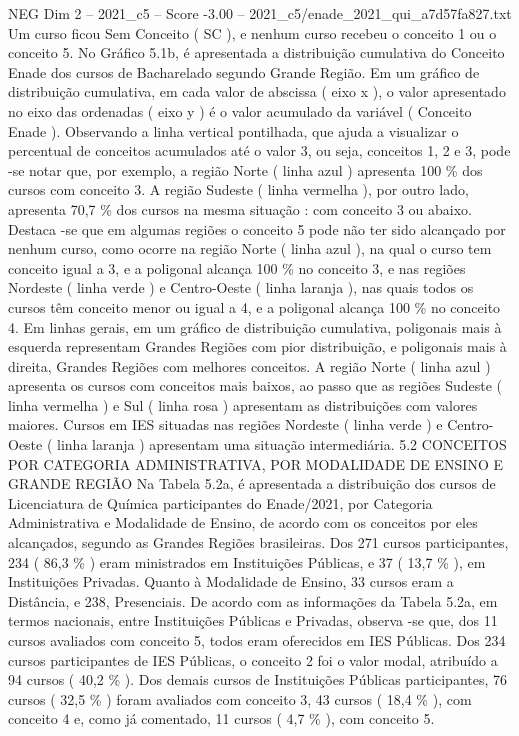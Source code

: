 \begin{textsample}{NEG Dim 2 – 2021\_c5 – Score -3.00 – 2021\_c5/enade\_2021\_qui\_a7d57fa827.txt}
Um curso ficou Sem Conceito ( SC ), e nenhum curso recebeu o conceito 1 ou o conceito 5.
No Gráfico 5.1b, é apresentada a distribuição cumulativa do Conceito Enade dos cursos de Bacharelado segundo Grande Região.
Em um gráfico de distribuição cumulativa, em cada valor de abscissa ( eixo x ), o valor apresentado no eixo das ordenadas ( eixo y ) é o valor acumulado da variável ( Conceito Enade ).
Observando a linha vertical pontilhada, que ajuda a visualizar o percentual de conceitos acumulados até o valor 3, ou seja, conceitos 1, 2 e 3, pode -se notar que, por exemplo, a região Norte ( linha azul ) apresenta 100 \% dos cursos com conceito 3.
A região Sudeste ( linha vermelha ), por outro lado, apresenta 70,7 \% dos cursos na mesma situação : com conceito 3 ou abaixo.
Destaca -se que em algumas regiões o conceito 5 pode não ter sido alcançado por nenhum curso, como ocorre na região Norte ( linha azul ), na qual o curso tem conceito igual a 3, e a poligonal alcança 100 \% no conceito 3, e nas regiões Nordeste ( linha verde ) e Centro-Oeste ( linha laranja ), nas quais todos os cursos têm conceito menor ou igual a 4, e a poligonal alcança 100 \% no conceito 4.
Em linhas gerais, em um gráfico de distribuição cumulativa, poligonais mais à esquerda representam Grandes Regiões com pior distribuição, e poligonais mais à direita, Grandes Regiões com melhores conceitos.
A região Norte ( linha azul ) apresenta os cursos com conceitos mais baixos, ao passo que as regiões Sudeste ( linha vermelha ) e Sul ( linha rosa ) apresentam as distribuições com valores maiores.
Cursos em IES situadas nas regiões Nordeste ( linha verde ) e Centro-Oeste ( linha laranja ) apresentam uma situação intermediária. 5.2 CONCEITOS POR CATEGORIA ADMINISTRATIVA, POR MODALIDADE DE ENSINO E GRANDE REGIÃO Na Tabela 5.2a, é apresentada a distribuição dos cursos de Licenciatura de Química participantes do Enade/2021, por Categoria Administrativa e Modalidade de Ensino, de acordo com os conceitos por eles alcançados, segundo as Grandes Regiões brasileiras.
Dos 271 cursos participantes, 234 ( 86,3 \% ) eram ministrados em Instituições Públicas, e 37 ( 13,7 \% ), em Instituições Privadas.
Quanto à Modalidade de Ensino, 33 cursos eram a Distância, e 238, Presenciais.
De acordo com as informações da Tabela 5.2a, em termos nacionais, entre Instituições Públicas e Privadas, observa -se que, dos 11 cursos avaliados com conceito 5, todos eram oferecidos em IES Públicas.
Dos 234 cursos participantes de IES Públicas, o conceito 2 foi o valor modal, atribuído a 94 cursos ( 40,2 \% ).
Dos demais cursos de Instituições Públicas participantes, 76 cursos ( 32,5 \% ) foram avaliados com conceito 3, 43 cursos ( 18,4 \% ), com conceito 4 e, como já comentado, 11 cursos ( 4,7 \% ), com conceito 5.

\end{textsample}
